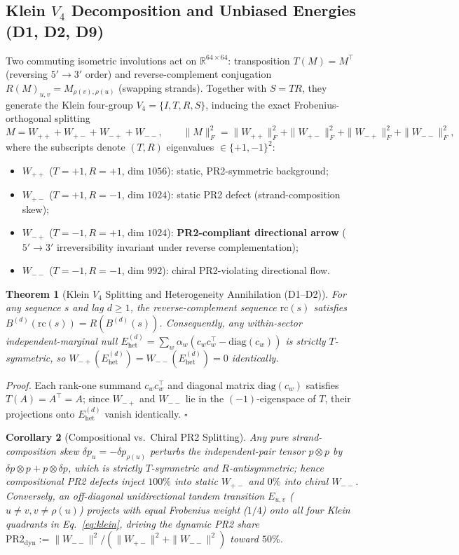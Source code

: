 \documentclass[11pt,a4paper]{article}
\newtheorem{theorem}{Theorem}
\newtheorem{corollary}[theorem]{Corollary}
\newcommand{\Wpp}{W_{++}}
\newcommand{\Wpm}{W_{+-}}
\newcommand{\Wmp}{W_{-+}}
\newcommand{\Wmm}{W_{--}}
\begin{document}
\subsection{Klein $V_4$ Decomposition and Unbiased Energies (D1, D2, D9)}
Two commuting isometric involutions act on $\mathbb{R}^{64\times 64}$: transposition $T(M) = M^\top$ (reversing $5'\!\to 3'$ order) and reverse-complement conjugation $R(M)_{u,v} = M_{\rho(v),\rho(u)}$ (swapping strands). Together with $S = TR$, they generate the Klein four-group $V_4 = \{I, T, R, S\}$, inducing the exact Frobenius-orthogonal splitting
\begin{equation}
  M = \Wpp + \Wpm + \Wmp + \Wmm, \qquad
  \|M\|_F^2 = \|\Wpp\|_F^2 + \|\Wpm\|_F^2 + \|\Wmp\|_F^2 + \|\Wmm\|_F^2,
  \label{eq:klein}
\end{equation}
where the subscripts denote $(T,R)$ eigenvalues $\in \{+1,-1\}^2$:
\begin{itemize}
  \item $\Wpp$ ($T=+1, R=+1$, dim $1056$): static, PR2-symmetric background;
  \item $\Wpm$ ($T=+1, R=-1$, dim $1024$): static PR2 defect (strand-composition skew);
  \item $\Wmp$ ($T=-1, R=+1$, dim $1024$): \textbf{PR2-compliant directional arrow} ($5'\!\to 3'$ irreversibility invariant under reverse complementation);
  \item $\Wmm$ ($T=-1, R=-1$, dim $992$): chiral PR2-violating directional flow.
\end{itemize}
\begin{theorem}[Klein $V_4$ Splitting and Heterogeneity Annihilation (D1--D2)]
\label{thm:klein_het}
For any sequence $s$ and lag $d\ge 1$, the reverse-complement sequence $\mathrm{rc}(s)$ satisfies $B^{(d)}(\mathrm{rc}(s)) = R(B^{(d)}(s))$. Consequently, any within-sector independent-marginal null $E_{\mathrm{het}}^{(d)} = \sum_w \alpha_w (c_w c_w^\top - \mathrm{diag}(c_w))$ is strictly $T$-symmetric, so $\Wmp(E_{\mathrm{het}}^{(d)}) = \Wmm(E_{\mathrm{het}}^{(d)}) = 0$ identically.
\end{theorem}
\noindent\textit{Proof.} Each rank-one summand $c_w c_w^\top$ and diagonal matrix $\mathrm{diag}(c_w)$ satisfies $T(A)=A^\top=A$; since $\Wmp$ and $\Wmm$ lie in the $(-1)$-eigenspace of $T$, their projections onto $E_{\mathrm{het}}^{(d)}$ vanish identically. $\square$

\begin{corollary}[Compositional vs.\ Chiral PR2 Splitting]
\label{cor:pr2_dyn}
Any pure strand-composition skew $\delta p_u = -\delta p_{\rho(u)}$ perturbs the independent-pair tensor $p\otimes p$ by $\delta p\otimes p + p\otimes \delta p$, which is strictly $T$-symmetric and $R$-antisymmetric; hence compositional PR2 defects inject $100\%$ into static $\Wpm$ and $0\%$ into chiral $\Wmm$. Conversely, an off-diagonal unidirectional tandem transition $E_{u,v}$ ($u\neq v, v\neq\rho(u)$) projects with equal Frobenius weight ($1/4$) onto all four Klein quadrants in Eq.~\eqref{eq:klein}, driving the dynamic PR2 share $\mathrm{PR2}_{\mathrm{dyn}} := \|\Wmm\|^2 / (\|\Wpm\|^2 + \|\Wmm\|^2)$ toward $50\%$.
\end{corollary}
\end{document}
